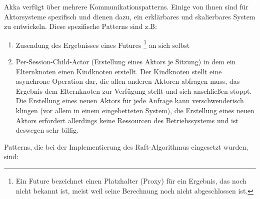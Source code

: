 Akka verfügt über mehrere Kommunikationspatterns. Einige von ihnen sind für Aktorsysteme spezifisch und dienen dazu, ein erklärbares und skalierbares System zu entwickeln. Diese spezifische Patterns sind z.B:

\begin{enumerate}
	\item Zusendung des Ergebnisses eines Futures \footnote{Ein Future bezeichnet einen Platzhalter (Proxy) für ein Ergebnis, das noch nicht bekannt ist, meist weil seine Berechnung noch nicht abgeschlossen ist.} an sich selbst
	
	\item Per-Session-Child-Actor (Erstellung eines Aktors je Sitzung) in dem ein Elternknoten einen Kindknoten erstellt. Der Kindknoten stellt eine asynchrone Operation dar, die allen anderen Aktoren abfragen muss, das Ergebnis dem Elternknoten zur Verfügung stellt und sich anschließen stoppt. Die Erstellung eines neuen Aktors für jede Anfrage kann verschwenderisch klingen (vor allem in einem eingebetteten System), die Erstellung eines neuen Aktors erfordert allerdings keine Ressourcen des Betriebssystems und ist deswegen sehr billig.
\end{enumerate}

Patterns, die bei der Implementierung des Raft-Algorithmus eingesetzt wurden, sind:

